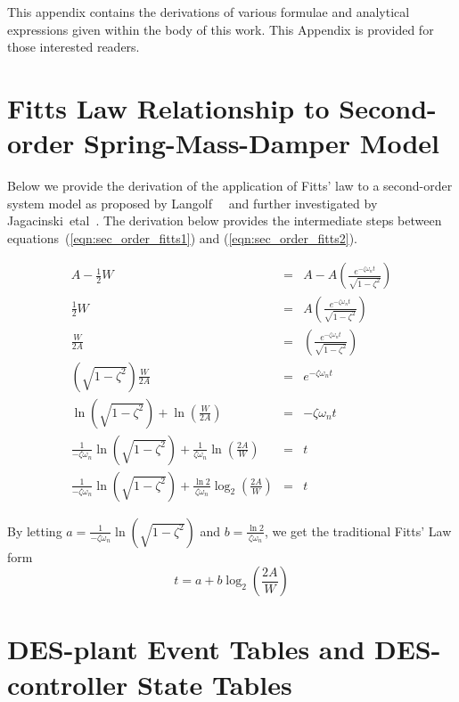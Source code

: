 This appendix contains the derivations of various formulae and analytical expressions given within the body of this work.  This Appendix is provided for those interested readers.

\section{Fitts Law Relationship to Second-order Spring-Mass-Damper Model}

Below we provide the derivation of the application of Fitts' law to a second-order system model as proposed by Langolf~\etal~\cite{LANGOLF73,LANGOLF76} and further investigated by Jagacinski~etal~\cite{Bib:Jagacinski}.  The derivation below provides the intermediate steps between equations~(\ref{eqn:sec_order_fitts1}) and (\ref{eqn:sec_order_fitts2}).

\begin{eqnarray}
A - \frac{1}{2}W & = & A - A\left(\frac{e^{-\zeta\omega_{n}t}}{\sqrt{1-\zeta^{2}}}\right) \nonumber \\
\frac{1}{2}W & = &  A\left(\frac{e^{-\zeta\omega_{n}t}}{\sqrt{1-\zeta^{2}}}\right) \nonumber \\
\frac{W}{2A} & = &  \left(\frac{e^{-\zeta\omega_{n}t}}{\sqrt{1-\zeta^{2}}}\right) \nonumber \\
\left(\sqrt{1-\zeta^{2}}\right)\frac{W}{2A} & = & e^{-\zeta\omega_{n}t} \nonumber \\
\ln\left(\sqrt{1-\zeta^{2}}\right)+\ln\left(\frac{W}{2A}\right) & = & -\zeta\omega_{n}t \nonumber \\
\frac{1}{-\zeta\omega_{n}}\ln\left(\sqrt{1-\zeta^{2}}\right)+\frac{1}{\zeta\omega_{n}}\ln\left(\frac{2A}{W}\right) & = & t \nonumber \\
\frac{1}{-\zeta\omega_{n}}\ln\left(\sqrt{1-\zeta^{2}}\right)+\frac{\ln2}{\zeta\omega_{n}}\log_{2}\left(\frac{2A}{W}\right) & = & t \nonumber
\end{eqnarray}

By letting $a=\frac{1}{-\zeta\omega_{n}}\ln(\sqrt{1-\zeta^{2}})$ and $b=\frac{\ln2}{\zeta\omega_{n}}$, we get the traditional Fitts' Law form
\begin{equation*}
t = a + b\log_{2}\left(\frac{2A}{W}\right) \nonumber
\end{equation*}

\section{DES-plant Event Tables and DES-controller State Tables}


